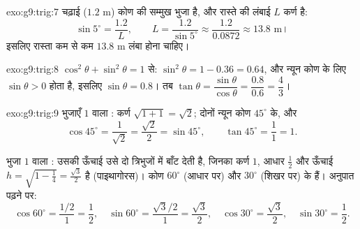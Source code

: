 \begin{solution}{exo:g9:trig:7}
चढ़ाई ($1.2$ m) कोण की सम्मुख भुजा है, और रास्ते की लंबाई $L$ कर्ण
है:
\[
\sin 5^\circ = \frac{1.2}{L},
\qquad
L = \frac{1.2}{\sin 5^\circ} \approx \frac{1.2}{0.0872} \approx 13.8
\text{ m।}
\]
इसलिए रास्ता कम से कम $13.8$ m लंबा होना चाहिए।
\end{solution}

\begin{solution}{exo:g9:trig:8}
$\cos^2\theta + \sin^2\theta = 1$ से:
$\sin^2\theta = 1 - 0.36 = 0.64$, और न्यून कोण के लिए
$\sin\theta > 0$ होता है, इसलिए $\sin\theta = 0.8$। तब
$\tan\theta = \dfrac{\sin\theta}{\cos\theta} = \dfrac{0.8}{0.6} =
\dfrac43$।
\end{solution}

\begin{solution}{exo:g9:trig:9}
 भुजाएँ $1$ वाला \emph{ }: कर्ण
$\sqrt{1 + 1} = \sqrt2$; दोनों न्यून कोण $45^\circ$ के, और
\[
\cos 45^\circ = \frac{1}{\sqrt2} = \frac{\sqrt2}{2} = \sin 45^\circ,
\qquad
\tan 45^\circ = \frac11 = 1 .
\]

भुजा $1$ वाला \emph{}: उसकी ऊँचाई उसे दो 
त्रिभुजों में बाँट देती है, जिनका कर्ण $1$, आधार $\frac12$ और ऊँचाई
$h = \sqrt{1 - \frac14} = \frac{\sqrt3}{2}$ है (पाइथागोरस)। कोण
$60^\circ$ (आधार पर) और $30^\circ$ (शिखर पर) के हैं। अनुपात पढ़ने
पर:
\[
\cos 60^\circ = \frac{1/2}{1} = \frac12, \quad
\sin 60^\circ = \frac{\sqrt3/2}{1} = \frac{\sqrt3}{2}, \quad
\cos 30^\circ = \frac{\sqrt3}{2}, \quad
\sin 30^\circ = \frac12 .
\]
\end{solution}

